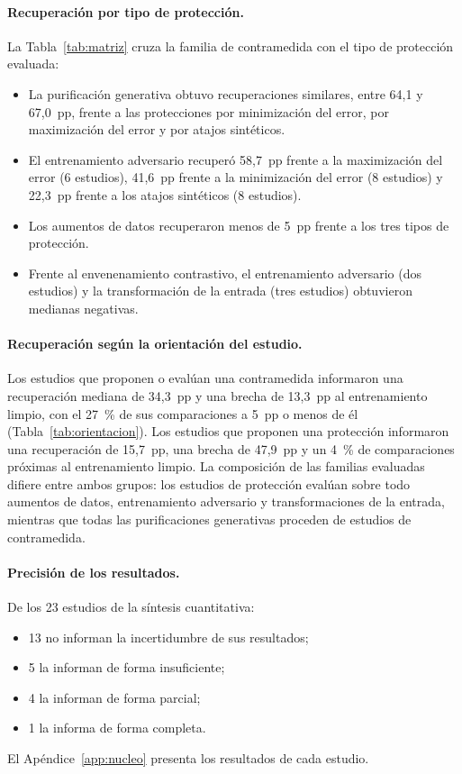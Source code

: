 \paragraph{Recuperación por tipo de protección.} La Tabla~\ref{tab:matriz} cruza la familia de contramedida con el tipo de protección evaluada:
\begin{itemize}
\item La purificación generativa obtuvo recuperaciones similares, entre 64,1 y 67,0~pp, frente a las protecciones por minimización del error, por maximización del error y por atajos sintéticos.
\item El entrenamiento adversario recuperó 58,7~pp frente a la maximización del error (6 estudios), 41,6~pp frente a la minimización del error (8 estudios) y 22,3~pp frente a los atajos sintéticos (8 estudios).
\item Los aumentos de datos recuperaron menos de 5~pp frente a los tres tipos de protección.
\item Frente al envenenamiento contrastivo, el entrenamiento adversario (dos estudios) y la transformación de la entrada (tres estudios) obtuvieron medianas negativas.
\end{itemize}



\paragraph{Recuperación según la orientación del estudio.} Los estudios que proponen o evalúan una contramedida informaron una recuperación mediana de 34,3~pp y una brecha de 13,3~pp al entrenamiento limpio, con el 27~\% de sus comparaciones a 5~pp o menos de él (Tabla~\ref{tab:orientacion}). Los estudios que proponen una protección informaron una recuperación de 15,7~pp, una brecha de 47,9~pp y un 4~\% de comparaciones próximas al entrenamiento limpio. La composición de las familias evaluadas difiere entre ambos grupos: los estudios de protección evalúan sobre todo aumentos de datos, entrenamiento adversario y transformaciones de la entrada, mientras que todas las purificaciones generativas proceden de estudios de contramedida.



\paragraph{Precisión de los resultados.} De los 23 estudios de la síntesis cuantitativa:
\begin{itemize}
\item 13 no informan la incertidumbre de sus resultados;
\item 5 la informan de forma insuficiente;
\item 4 la informan de forma parcial;
\item 1 la informa de forma completa.
\end{itemize}
El Apéndice~\ref{app:nucleo} presenta los resultados de cada estudio.

